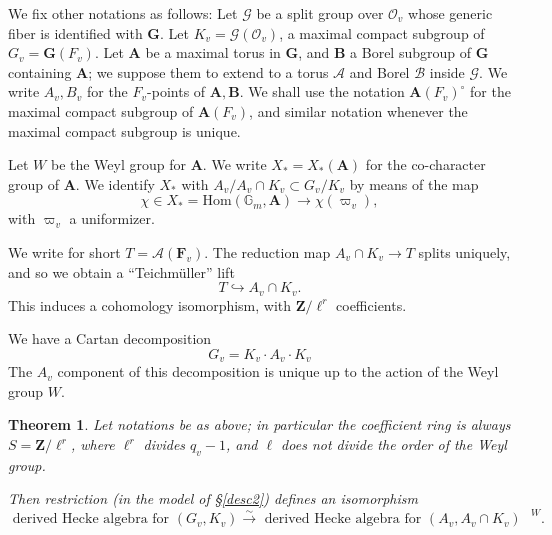 \documentclass[10pt]{amsart}
\newcommand{\Z}{\mathbf{Z}}
\newcommand{\Hom}{\mathrm{Hom}}
\newtheorem{theorem}[subsection]{Theorem}
\theoremstyle{remark}
\begin{document}
%
%
%
  We fix other notations as follows: Let $\mathcal{G}$ be a split group over $\mathcal{O}_v$   
  whose generic fiber is identified with $\mathbf{G}$. Let $K_v = \mathcal{G}(\mathcal{O}_v)$,
  a maximal compact subgroup of $G_v = \mathbf{G}(F_v)$. 
  Let $\mathbf{A}$ be a maximal torus in $\mathbf{G}$, and $\mathbf{B}$ a Borel subgroup of $\mathbf{G}$ containing $\mathbf{A}$; we suppose them to   
 extend to a torus $\mathcal{A}$ and Borel $\mathcal{B}$  inside $\mathcal{G}$.  We write $A_v, B_v$ for the $F_v$-points
  of $\mathbf{A},\mathbf{B}$.    We shall use the notation $\mathbf{A}(F_v)^{\circ}$ for the   maximal compact subgroup of $\mathbf{A}(F_v)$,
  and similar notation whenever the maximal compact subgroup is unique.  
  
  Let $W$ be the Weyl group for $\mathbf{A}$.  
We write $X_*= X_*(\mathbf{A})$ for the co-character group of $\mathbf{A}$.  
  We identify $X_*$ with $A_v/A_v\cap K_v \subset G_v/K_v$  by means of the map
\begin{equation} \label{IWidentification} \chi \in X_* = \Hom(\mathbb{G}_m, \mathbf{A}) \longrightarrow \chi(\varpi_v),\end{equation}
  with $\varpi_v$ a uniformizer. 
 
 We write for short
 $ T =\mathcal{A}(\mathbf{F}_v).$
  The reduction map $A_v \cap K_v \rightarrow  T$ splits uniquely, and so we obtain
  a ``Teichm{\"u}ller'' lift
\begin{equation} \label{teich}  T \hookrightarrow A_v \cap K_v. \end{equation}
This induces a cohomology isomorphism, with $\Z/\ell^r$ coefficients.     
   
   We have a Cartan decomposition
$$G_v = K_v \cdot A_v \cdot K_v  $$
The $A_v$ component of this decomposition is 
  unique up to the action of the Weyl group $W$.
  
  \begin{theorem} \label{DHA:Satake}  
Let notations be as above; in particular the coefficient ring is always $S=\Z/\ell^r$, where $\ell^r$ divides $q_v-1$,
and $\ell$ does not divide the order of the Weyl group. 



Then restriction (in the model of \S  \ref{desc2}) defines an isomorphism
   \begin{equation} \label{dSatake} \mbox{ derived Hecke algebra for $(G_v, K_v)$} 
\stackrel{\sim}{\longrightarrow} \mbox{ derived Hecke algebra for $(A_v, A_v \cap K_v)$ }^W.
  \end{equation}

  \end{theorem}
  
\end{document}
